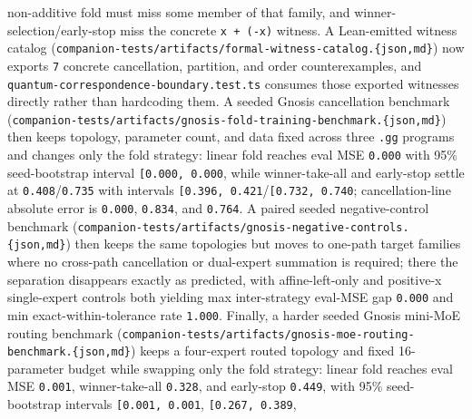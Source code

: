 \documentclass[
  11pt,
]{article}
\begin{document}
non-additive fold must miss some member of that family, and
winner-selection/early-stop miss the concrete \texttt{x\ +\ (-x)}
witness. A Lean-emitted witness catalog
(\texttt{companion-\allowbreak{}tests/\allowbreak{}artifacts/\allowbreak{}formal-\allowbreak{}witness-\allowbreak{}catalog.\allowbreak{}\{json,md\}})
now exports \texttt{7} concrete cancellation, partition, and order
counterexamples, and \texttt{quantum-correspondence-boundary.test.ts}
consumes those exported witnesses directly rather than hardcoding them.
A seeded Gnosis cancellation benchmark
(\texttt{companion-\allowbreak{}tests/\allowbreak{}artifacts/\allowbreak{}gnosis-\allowbreak{}fold-\allowbreak{}training-\allowbreak{}benchmark.\allowbreak{}\{json,md\}})
then keeps topology, parameter count, and data fixed across three
\texttt{.gg} programs and changes only the fold strategy: linear fold
reaches eval MSE \texttt{0.000} with 95\% seed-bootstrap interval
\texttt{{[}\textasciigrave{}\textasciigrave{}0.000,\ 0.000\textasciigrave{}\textasciigrave{}{]}},
while winner-take-all and early-stop settle at
\texttt{0.408}/\texttt{0.735} with intervals
\texttt{{[}\textasciigrave{}\textasciigrave{}0.396,\ 0.421\textasciigrave{}\textasciigrave{}{]}}/\texttt{{[}\textasciigrave{}\textasciigrave{}0.732,\ 0.740\textasciigrave{}\textasciigrave{}{]}};
cancellation-line absolute error is \texttt{0.000}, \texttt{0.834}, and
\texttt{0.764}. A paired seeded negative-control benchmark
(\texttt{companion-\allowbreak{}tests/\allowbreak{}artifacts/\allowbreak{}gnosis-\allowbreak{}negative-\allowbreak{}controls.\allowbreak{}\{json,md\}})
then keeps the same topologies but moves to one-path target families
where no cross-path cancellation or dual-expert summation is required;
there the separation disappears exactly as predicted, with
affine-left-only and positive-x single-expert controls both yielding max
inter-strategy eval-MSE gap \texttt{0.000} and min
exact-within-tolerance rate \texttt{1.000}. Finally, a harder seeded
Gnosis mini-MoE routing benchmark
(\texttt{companion-\allowbreak{}tests/\allowbreak{}artifacts/\allowbreak{}gnosis-\allowbreak{}moe-\allowbreak{}routing-\allowbreak{}benchmark.\allowbreak{}\{json,md\}})
keeps a four-expert routed topology and fixed 16-parameter budget while
swapping only the fold strategy: linear fold reaches eval MSE
\texttt{0.001}, winner-take-all \texttt{0.328}, and early-stop
\texttt{0.449}, with 95\% seed-bootstrap intervals
\texttt{{[}\textasciigrave{}\textasciigrave{}0.001,\ 0.001\textasciigrave{}\textasciigrave{}{]}},
\texttt{{[}\textasciigrave{}\textasciigrave{}0.267,\ 0.389\textasciigrave{}\textasciigrave{}{]}},
\end{document}
